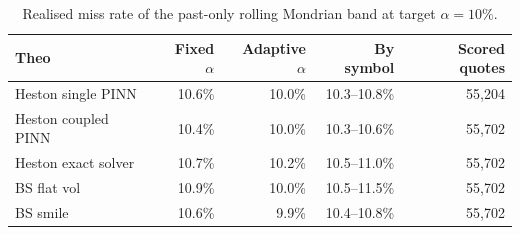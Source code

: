 \begin{table}[t]
\centering
\small
\caption{Realised miss rate of the past-only rolling Mondrian band at target $\alpha=10\%$.}
\label{tab:coverage}
\begin{tabular}{lrrrr}
\toprule
Theo & Fixed $\alpha$ & Adaptive $\alpha$ & By symbol & Scored quotes \\
\midrule
Heston single PINN & 10.6\% & 10.0\% & 10.3--10.8\% & 55,204 \\
Heston coupled PINN & 10.4\% & 10.0\% & 10.3--10.6\% & 55,702 \\
Heston exact solver & 10.7\% & 10.2\% & 10.5--11.0\% & 55,702 \\
BS flat vol & 10.9\% & 10.0\% & 10.5--11.5\% & 55,702 \\
BS smile & 10.6\% & 9.9\% & 10.4--10.8\% & 55,702 \\
\bottomrule
\end{tabular}
\end{table}
